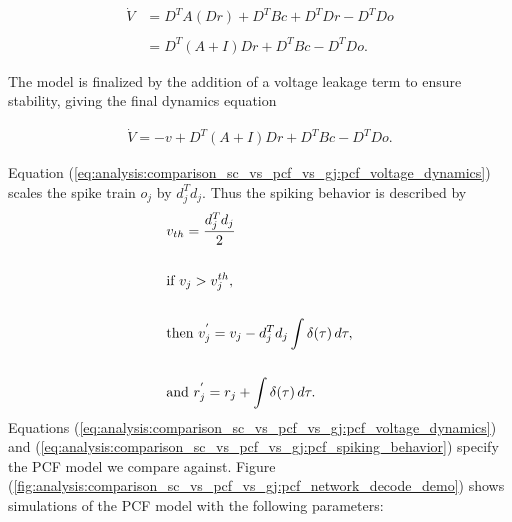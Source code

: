 \begin{enumerate}
\begin{align*}
\dot{V} &= D^T A \left(D r\right) + D^T B c + D^T D r - D^T D o
%
\\
\\
%
&= 
D^T
\left(
	A + I 
\right)
 D r
+
D^T B c 
- D^T D o. 
\end{align*}

The model is finalized by the addition of a voltage leakage term to ensure stability, giving the final dynamics equation

\begin{align}
\label{eq:analysis:comparison_sc_vs_pcf_vs_gj:pcf_voltage_dynamics}
\dot{V} = -v
+ D^T 
\left(
A + I
\right)
D r
+ 
D^T B c
- D^T D o.
\end{align}

Equation (\ref{eq:analysis:comparison_sc_vs_pcf_vs_gj:pcf_voltage_dynamics}) scales the spike train $o_j$ by $d_j^T d_j$. Thus the spiking behavior is described by
\begin{align}
\label{eq:analysis:comparison_sc_vs_pcf_vs_gj:pcf_spiking_behavior}
    &v_{th} = \frac{ d_j^T d_j }{2} \notag \\
    \notag \\
    &\text{if  } v_j > v^{th}_j,\notag \\
    \\
    &\text{then  } v_j^{'} = v_j - d_j^T d_j \int \delta(\tau)  \, d\tau ,\notag \\
    \notag \\ 
    &\text{and  } r_j^{'} = r_j + \int \delta(\tau)  \, d\tau \notag.
\end{align}
Equations (\ref{eq:analysis:comparison_sc_vs_pcf_vs_gj:pcf_voltage_dynamics}) and (\ref{eq:analysis:comparison_sc_vs_pcf_vs_gj:pcf_spiking_behavior}) specify the PCF model we compare against. Figure (\ref{fig:analysis:comparison_sc_vs_pcf_vs_gj:pcf_network_decode_demo}) shows simulations of the PCF model with the following parameters:


\end{enumerate}
